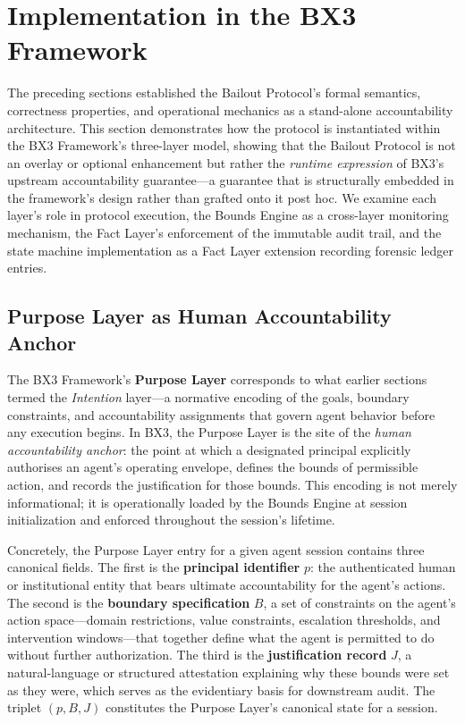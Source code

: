 \section{Implementation in the BX3 Framework}

The preceding sections established the Bailout Protocol's formal semantics, correctness properties, and operational mechanics as a stand-alone accountability architecture. This section demonstrates how the protocol is instantiated within the BX3 Framework's three-layer model, showing that the Bailout Protocol is not an overlay or optional enhancement but rather the \emph{runtime expression} of BX3's upstream accountability guarantee—a guarantee that is structurally embedded in the framework's design rather than grafted onto it post hoc. We examine each layer's role in protocol execution, the Bounds Engine as a cross-layer monitoring mechanism, the Fact Layer's enforcement of the immutable audit trail, and the state machine implementation as a Fact Layer extension recording forensic ledger entries.

\subsection{Purpose Layer as Human Accountability Anchor}

The BX3 Framework's \textbf{Purpose Layer} corresponds to what earlier sections termed the \emph{Intention} layer—a normative encoding of the goals, boundary constraints, and accountability assignments that govern agent behavior before any execution begins. In BX3, the Purpose Layer is the site of the \emph{human accountability anchor}: the point at which a designated principal explicitly authorises an agent's operating envelope, defines the bounds of permissible action, and records the justification for those bounds. This encoding is not merely informational; it is operationally loaded by the Bounds Engine at session initialization and enforced throughout the session's lifetime.

Concretely, the Purpose Layer entry for a given agent session contains three canonical fields. The first is the \textbf{principal identifier} $p$: the authenticated human or institutional entity that bears ultimate accountability for the agent's actions. The second is the \textbf{boundary specification} $B$, a set of constraints on the agent's action space—domain restrictions, value constraints, escalation thresholds, and intervention windows—that together define what the agent is permitted to do without further authorization. The third is the \textbf{justification record} $J$, a natural-language or structured attestation explaining why these bounds were set as they were, which serves as the evidentiary basis for downstream audit. The triplet $(p, B, J)$ constitutes the Purpose Layer's canonical state for a session.


